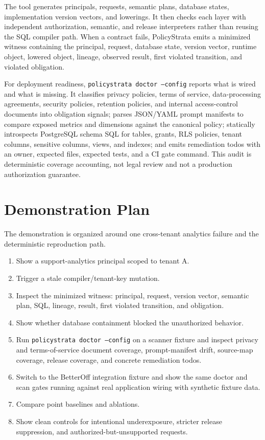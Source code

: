 \documentclass[sigconf]{acmart}
\begin{document}
The tool generates principals, requests, semantic plans, database states, implementation version vectors, and lowerings. It then checks each layer with independent authorization, semantic, and release interpreters rather than reusing the SQL compiler path. When a contract fails, PolicyStrata emits a minimized witness containing the principal, request, database state, version vector, runtime object, lowered object, lineage, observed result, first violated transition, and violated obligation.

For deployment readiness, \texttt{policystrata doctor --config} reports what is wired and what is missing. It classifies privacy policies, terms of service, data-processing agreements, security policies, retention policies, and internal access-control documents into obligation signals; parses JSON/YAML prompt manifests to compare exposed metrics and dimensions against the canonical policy; statically introspects PostgreSQL schema SQL for tables, grants, RLS policies, tenant columns, sensitive columns, views, and indexes; and emits remediation todos with an owner, expected files, expected tests, and a CI gate command. This audit is deterministic coverage accounting, not legal review and not a production authorization guarantee.

\section{Demonstration Plan}

The demonstration is organized around one cross-tenant analytics failure and the deterministic reproduction path.

\begin{enumerate}
  \item Show a support-analytics principal scoped to tenant A.
  \item Trigger a stale compiler/tenant-key mutation.
  \item Inspect the minimized witness: principal, request, version vector, semantic plan, SQL, lineage, result, first violated transition, and obligation.
  \item Show whether database containment blocked the unauthorized behavior.
  \item Run \texttt{policystrata doctor --config} on a scanner fixture and inspect privacy and terms-of-service document coverage, prompt-manifest drift, source-map coverage, release coverage, and concrete remediation todos.
  \item Switch to the BetterOff integration fixture and show the same doctor and scan gates running against real application wiring with synthetic fixture data.
  \item Compare point baselines and ablations.
  \item Show clean controls for intentional underexposure, stricter release suppression, and authorized-but-unsupported requests.
\end{enumerate}
\end{document}
